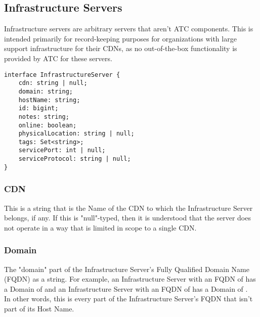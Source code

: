 %
%
\subsection{Infrastructure Servers}
Infrastructure servers are arbitrary servers that aren't ATC components. This
is intended primarily for record-keeping purposes for organizations with large
support infrastructure for their CDNs, as no out-of-the-box functionality is
provided by ATC for these servers.

\begin{codelisting}
\begin{verbatim}
interface InfrastructureServer {
	cdn: string | null;
	domain: string;
	hostName: string;
	id: bigint;
	notes: string;
	online: boolean;
	physicalLocation: string | null;
	tags: Set<string>;
	servicePort: int | null;
	serviceProtocol: string | null;
}
\end{verbatim}
\end{codelisting}

\subsubsection{CDN}
This is a string that is the Name of the CDN to which the Infrastructure Server
belongs, if any. If this is "null"-typed, then it is understood that the server
does not operate in a way that is limited in scope to a single CDN.

\subsubsection{Domain}
The "domain" part of the Infrastructure Server's Fully Qualified Domain Name
(FQDN) as a string. For example, an Infrastructure Server with an FQDN of
 has a Domain of  and an Infrastructure Server with
an FQDN of  has a Domain of
.\\
In other words, this is every part of the Infrastructure Server's FQDN that
isn't part of its Host Name.

